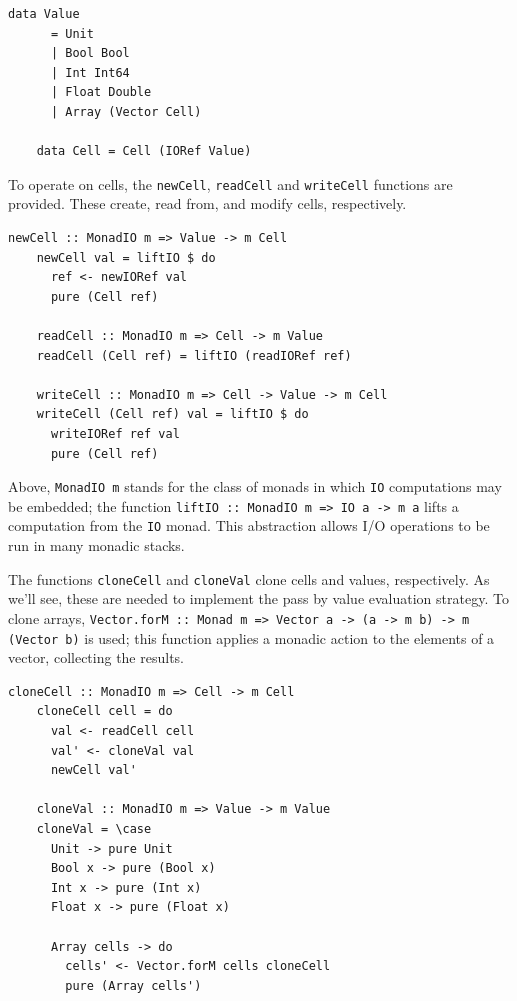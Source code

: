 \documentclass[UdineBachThesis,american,11pt]{PhdThesis}
\begin{document}
  \begin{Verbatim}[gobble=4,fontsize=\small]
    data Value
      = Unit
      | Bool Bool
      | Int Int64
      | Float Double
      | Array (Vector Cell)

    data Cell = Cell (IORef Value)
  \end{Verbatim}

  To operate on cells, the \mbox{\texttt{newCell}}, \mbox{\texttt{readCell}} and
  \mbox{\texttt{writeCell}} functions are provided. These create, read from, and
  modify cells, respectively.

  \begin{Verbatim}[gobble=4,fontsize=\small]
    newCell :: MonadIO m => Value -> m Cell
    newCell val = liftIO $ do
      ref <- newIORef val
      pure (Cell ref)

    readCell :: MonadIO m => Cell -> m Value
    readCell (Cell ref) = liftIO (readIORef ref)

    writeCell :: MonadIO m => Cell -> Value -> m Cell
    writeCell (Cell ref) val = liftIO $ do
      writeIORef ref val
      pure (Cell ref)
  \end{Verbatim}

  Above, \mbox{\texttt{MonadIO m}} stands for the class of monads in which
  \mbox{\texttt{IO}} computations may be embedded; the function
  \mbox{\texttt{liftIO :: MonadIO m => IO a -> m a}} lifts a computation from
  the \mbox{\texttt{IO}} monad. This abstraction allows I/O operations to be run
  in many monadic stacks.

  The functions \mbox{\texttt{cloneCell}} and \mbox{\texttt{cloneVal}} clone
  cells and values, respectively. As we'll see, these are needed to implement
  the pass by value evaluation strategy. To clone arrays,
  \mbox{\texttt{Vector.forM :: Monad m => Vector a -> (a -> m b) -> m (Vector b)}}
  is used; this function applies a monadic action to the elements of a vector,
  collecting the results.

  \begin{Verbatim}[gobble=4,fontsize=\small]
    cloneCell :: MonadIO m => Cell -> m Cell
    cloneCell cell = do
      val <- readCell cell
      val' <- cloneVal val
      newCell val'

    cloneVal :: MonadIO m => Value -> m Value
    cloneVal = \case
      Unit -> pure Unit
      Bool x -> pure (Bool x)
      Int x -> pure (Int x)
      Float x -> pure (Float x)

      Array cells -> do
        cells' <- Vector.forM cells cloneCell
        pure (Array cells')
  \end{Verbatim}
\end{document}
